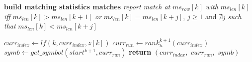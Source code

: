 \documentclass[a4paper,12pt, oneside]{book}
\begin{document}
\begin{algorithm}
\begin{algorithmic}[1]
    \For {\textit{every} $k\in[0,|ms_{row}|)$}
    \Comment \textbf{build matching statistics matches}
    \State \textit{report match at} $ms_{row}[k]$ \textit{with} $ms_{len}[k]$
    \textit{iff} $ms_{len}[k]> ms_{len}[k+1]$
    \State \textit{or} $ms_{len}[k]= ms_{len}[k+j]$, $j\geq 1$ and $\nexists j$
    \textit{such that}  $ms_{len}[k]< ms_{len}[k+j]$
    \EndFor
    \EndFunction
    
  \end{algorithmic}
  \caption{Algoritmo per match con matching-statistics (MS) e LCE}
\end{algorithm}
\begin{algorithm}
  \begin{algorithmic}[1]
    \State $curr_{index}\gets lf(k, curr_{index}, z[k])$
    \State $curr_{run}\gets rank_h^{k+1}(curr_{index})$
    \State $symb\gets get\_symbol(start^{k+1}, curr_{run})$
    \State \textbf{return} $(curr_{index},\,\,curr_{run},\,\,symb)$
    \EndFunction
  \end{algorithmic}
  \caption{Algorithm to update values for matching statistics of RLPBWT} 
\end{algorithm}
\end{document}
